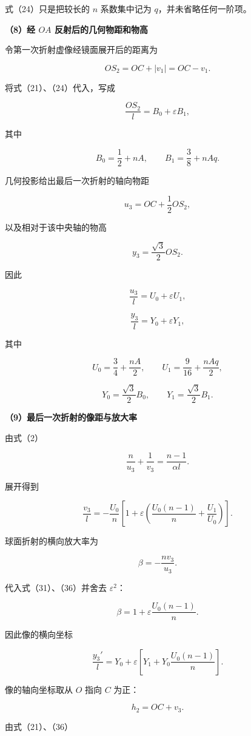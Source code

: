 \documentclass[12pt,a4paper,UTF8]{ctexart}
\begin{document}
式（24）只是把较长的 \(n\) 系数集中记为 \(q\)，并未省略任何一阶项。

\textbf{（8）经 \(OA\) 反射后的几何物距和物高}

令第一次折射虚像经镜面展开后的距离为

\[
OS_2=OC+|v_1|=OC-v_1.
\tag{26}
\]

将式（21）、（24）代入，写成

\[
\frac{OS_2}{l}=B_0+\varepsilon B_1,
\tag{27}
\]

其中

\[
B_0=\frac12+nA,
\qquad
B_1=\frac38+nAq.
\tag{28}
\]

几何投影给出最后一次折射的轴向物距

\[
u_3=OC+\frac12OS_2,
\tag{29}
\]

以及相对于该中央轴的物高

\[
y_3=\frac{\sqrt3}{2}OS_2.
\tag{30}
\]

因此

\[
\frac{u_3}{l}=U_0+\varepsilon U_1,
\tag{31}
\]

\[
\frac{y_3}{l}=Y_0+\varepsilon Y_1,
\tag{32}
\]

其中

\[
U_0=\frac34+\frac{nA}{2},
\qquad
U_1=\frac9{16}+\frac{nAq}{2},
\tag{33}
\]

\[
Y_0=\frac{\sqrt3}{2}B_0,
\qquad
Y_1=\frac{\sqrt3}{2}B_1.
\tag{34}
\]

\textbf{（9）最后一次折射的像距与放大率}

由式（2）

\[
\frac n{u_3}+\frac1{v_3}
=\frac{n-1}{\alpha l}.
\tag{35}
\]

展开得到

\[
\boxed{
\frac{v_3}{l}
=-\frac{U_0}{n}
\left[
1+\varepsilon
\left(
\frac{U_0(n-1)}n+\frac{U_1}{U_0}
\right)
\right]
}.
\tag{36}
\]

球面折射的横向放大率为

\[
\beta=-\frac{nv_3}{u_3}.
\tag{37}
\]

代入式（31）、（36）并舍去 \(\varepsilon^2\)：

\[
\boxed{
\beta
=1+\varepsilon\frac{U_0(n-1)}n
}.
\tag{38}
\]

因此像的横向坐标

\[
\boxed{
\frac{y_3'}l
=Y_0
+\varepsilon
\left[
Y_1+Y_0\frac{U_0(n-1)}n
\right]
}.
\tag{39}
\]

像的轴向坐标取从 \(O\) 指向 \(C\) 为正：

\[
h_2=OC+v_3.
\]

由式（21）、（36）
\end{document}
